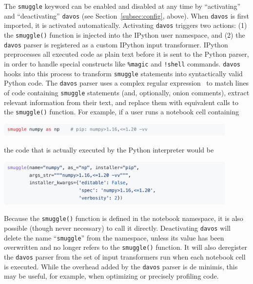 \documentclass[preprint,12pt,a4paper]{elsarticle}
\begin{document}
The \texttt{smuggle} keyword can be enabled and disabled at any time by ``activating'' and ``deactivating'' \texttt{davos} (see Section~\ref{subsec:config}, above). When \texttt{davos} is first imported, it is activated automatically. Activating \texttt{davos} triggers two actions: (1) the \texttt{smuggle()} function is injected into the IPython user namespace, and (2) the \texttt{davos} parser is registered as a custom IPython input transformer. IPython preprocesses all executed code as plain text before it is sent to the Python parser, in order to handle special constructs like \texttt{\%magic} and \texttt{!shell} commands. \texttt{davos} hooks into this process to transform \texttt{smuggle} statements into syntactically valid Python code. The \texttt{davos} parser uses a complex regular expression~\cite{Thom68} to match lines of code containing \texttt{smuggle} statements (and, optionally, onion comments), extract relevant information from their text, and replace them with equivalent calls to the \texttt{smuggle()} function. For example, if a user runs a notebook cell containing
\begin{center}
\includegraphics[width=0.9\textwidth]{figs/snippet6}
\end{center}
the code that is actually executed by the Python interpreter would be
\begin{center}
\includegraphics[width=0.9\textwidth]{figs/snippet7}
\end{center}
Because the \texttt{smuggle()} function is defined in the notebook namespace, it is also possible (though never necessary) to call it directly. Deactivating \texttt{davos} will delete the name ``\texttt{smuggle}'' from the namespace, unless its value has been overwritten and no longer refers to the \texttt{smuggle()} function. It will also deregister the \texttt{davos} parser from the set of input transformers run when each notebook cell is executed. While the overhead added by the \texttt{davos} parser is de minimis, this may be useful, for example, when optimizing or precisely profiling code.


\end{document}
